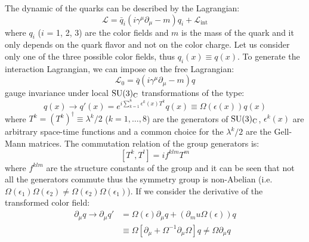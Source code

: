 The dynamic of the quarks can be described by the Lagrangian:
\begin{equation}
  \label{eq:127}
  \mathcal{L} = \bar{q}_i \left( i \gamma^\mu \partial_\mu - m \right) q_i +
  \mathcal{L}_\mathrm{int}
\end{equation}
where $q_i$ ($i$ = 1, 2, 3) are the color fields and $m$ is the mass of the
quark and it only depends on the quark flavor and not on the color charge. Let
us consider only one of the three possible color fields, thus
$q_i (x) \equiv q(x)$. To generate the interaction Lagrangian, we can impose on
the free Lagrangian:
\begin{equation}
  \label{eq:129}
    \mathcal{L}_0 = \bar{q} \left( i \gamma^\mu \partial_\mu - m \right) q
\end{equation}
gauge invariance under local $\mathrm{SU}(3)_\mathrm{C}$ transformations of the type:
\begin{equation}
  \label{eq:128}
  q(x) \rightarrow q'(x) = e^{i \sum_{k = 1}^8 \epsilon^k(x) T^k} q(x) \equiv
  \Omega(\epsilon(x)) q(x)
\end{equation}
where $T^k = \left( T^k \right)^\dag \equiv \lambda^k / 2$ ($k = 1, \dots, 8$)
are the generators of $\mathrm{SU}(3)_\mathrm{C}$, $\epsilon^k(x)$ are arbitrary space-time
functions and a common choice for the $\lambda^k / 2$ are the Gell-Mann
matrices. The commutation relation of the group generators is:
\begin{equation}
  \label{eq:130}
  \left[ T^k, T^l \right] = i f^{klm} T^m
\end{equation}
where $f^{klm}$ are the structure constants of the group and it can be seen that
not all the generators commute thus the symmetry group is non-Abelian
(i.e.
$\Omega(\epsilon_1) \Omega(\epsilon_2) \neq \Omega(\epsilon_2)
\Omega(\epsilon_1)$). If we consider the derivative of the transformed color
field:
\begin{equation}
  \label{eq:131}
  \begin{aligned}
    \partial_\mu q \rightarrow \partial_\mu q' & = \Omega(\epsilon) \partial_\mu q
    + \left( \partial_mu \Omega(\epsilon) \right) q \\ \quad & \equiv \Omega
    \left[ \partial_\mu + \Omega^{-1} \partial_\mu \Omega \right] q \neq
      \Omega \partial_\mu q
    \end{aligned}
\end{equation}
